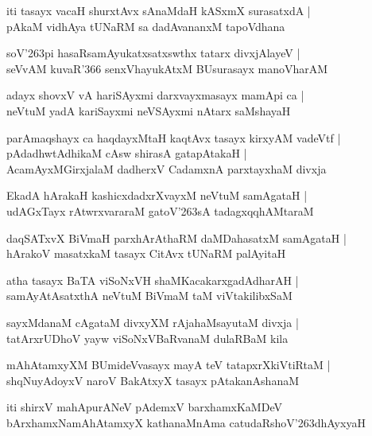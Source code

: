 \begin{shloka}
iti tasayx vacaH shurxtAvx sAnaMdaH kASxmX surasatxdA |\\
pAkaM vidhAya tUNaRM sa dadAvananxM tapoVdhana
\end{shloka}

\begin{shloka}
soV\char'263pi hasaRsamAyukatxsatxswthx tatarx divxjAlayeV |\\
seVvAM kuvaR\char'366 senxVhayukAtxM BUsurasayx manoVharAM
\end{shloka}

\begin{shloka}
adayx shovxV vA hariSAyxmi darxvayxmasayx mamApi ca |\\
neVtuM yadA kariSayxmi neVSAyxmi nAtarx saMshayaH 
\end{shloka}

\begin{shloka}
parAmaqshayx ca haqdayxMtaH kaqtAvx tasayx kirxyAM vadeVtf |\\
pAdadhwtAdhikaM cAsw shirasA gatapAtakaH |\\
AcamAyxMGirxjalaM dadherxV CadamxnA parxtayxhaM divxja
\end{shloka}

\begin{shloka}
EkadA hArakaH kashicxdadxrXvayxM neVtuM samAgataH |\\
udAGxTayx rAtwrxvararaM gatoV\char'263sA tadagxqqhAMtaraM
\end{shloka}

\begin{shloka}
daqSATxvX BiVmaH parxhArAthaRM daMDahasatxM samAgataH |\\
hArakoV masatxkaM tasayx CitAvx tUNaRM palAyitaH
\end{shloka}

\begin{shloka}
atha tasayx BaTA viSoNxVH shaMKacakarxgadAdharAH |\\
samAyAtAsatxthA neVtuM BiVmaM taM viVtakilibxSaM
\end{shloka}

\begin{shloka}
sayxMdanaM cAgataM divxyXM rAja{ha}MsayutaM divxja |\\
tatArxrUDhoV yayw viSoNxVBaRvanaM dulaRBaM kila
\end{shloka}

\begin{shloka}
mAhAtamxyXM BUmideVvasayx mayA teV tatapxrXkiVtiRtaM |\\
shqNuyAdoyxV naroV BakAtxyX tasayx pAtakanAshanaM
\end{shloka}
iti shirxV mahApurANeV pAdemxV barxhamxKaMDeV bArxhamxNamAhAtamxyX kathanaMnAma catudaRshoV\char'263dhAyxyaH

